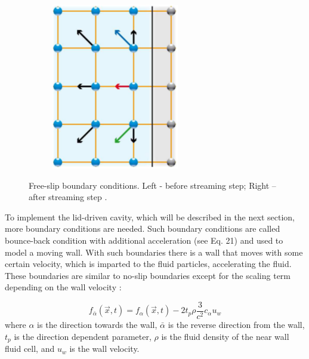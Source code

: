 \begin{figure}[H]
\begin{subfigure}[h]{0.3\textwidth}
    \includegraphics[width=\textwidth]{img/fig9-2.png}
  \end{subfigure}
  \caption{Free-slip boundary conditions. Left - before streaming step; Right – after streaming step \cite{pflaum}.}\label{fig:free-slip-BC}
\end{figure}

To implement the lid-driven cavity, which will be described in the next section, more boundary conditions are needed. Such boundary conditions are called bounce-back condition with additional acceleration (see Eq. 21) and used to model a moving wall. With such boundaries there is a wall that moves with some certain velocity, which is imparted to the fluid particles, accelerating the fluid. These boundaries are similar to no-slip boundaries except for the scaling term depending on the wall velocity \cite{pflaum}:

\begin{equation}
f_{\bar{\alpha}}(\vec{x},t) = f_{\alpha}(\vec{x},t) - 2 t_p \rho \frac{3}{c^2} c_{\alpha} u_{w}
\end{equation}
where $\alpha$ is the direction towards the wall, $\bar{\alpha}$ is the reverse direction from the wall, $t_p$ is the direction dependent parameter, $\rho$ is the fluid density of the near wall fluid cell, and $u_w$ is the wall velocity.
